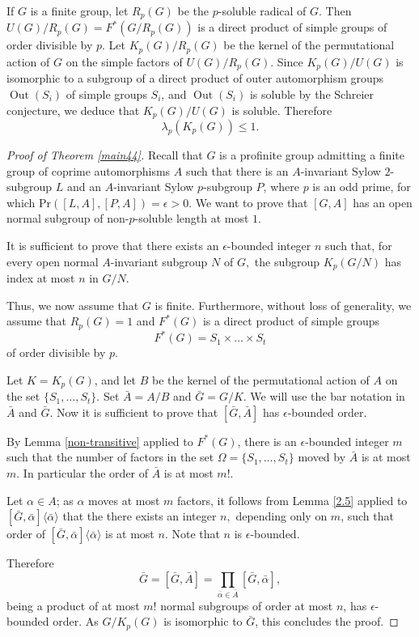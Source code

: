 \documentclass[12pt]{amsart}
\newcommand{\al }{\alpha }
\newcommand{\pr }{\mathrm{Pr} }
\newcommand{\ep}{\epsilon}
\DeclareMathOperator{\out}{Out}
\begin{document}
If $G$ is a finite group, let $R_p(G)$ be the $p$-soluble radical of $G$. Then $U(G)/R_p(G)=F^*(G/R_p(G))$ is a direct product of  simple groups of order divisible by $p$. Let $K_p(G)/R_p(G)$ be the kernel of the permutational action of $G$ on the simple factors of $U(G)/R_p(G)$. Since $K_p(G)/U(G)$ is isomorphic to a subgroup of a direct product of  outer automorphism groups $\out(S_i)$ of  simple groups $S_i$, and  $\out(S_i)$ is soluble by the Schreier conjecture, we deduce 
 that $K_p(G)/U(G)$ is soluble. Therefore 
\[\lambda_p(K_p(G))\le 1. \]

\begin{proof}[Proof of Theorem \ref{main44}] Recall that $G$ is a  profinite group admitting a finite group of coprime automorphisms $A$ such that there is an $A$-invariant Sylow $2$-subgroup $L$ and an $A$-invariant Sylow $p$-subgroup $P$, where $p$ is an odd prime, for which $\pr([L,A],[P,A])=\ep>0$. 
We want to prove that $[G,A]$ has an open normal subgroup of non-$p$-soluble length at most $1$. 

It is sufficient to prove that there exists an $\epsilon$-bounded integer $n$ such that, for every open normal $A$-invariant subgroup $N$   of $G,$ the subgroup $K_p(G/N)$ has index at most $n$ in $G/N$. 

Thus, we now assume that $G$ is finite. Furthermore, without loss of generality, we assume that $R_p(G)=1$ and $F^*(G)$ is a direct product of simple groups 
    \[F^*(G)=S_1\times\dots\times S_t\] of order divisible by $p$.
 
    
Let $K=K_p(G)$, and let $B$ be the kernel of the permutational action of $A$ on the set $\{S_1,\dots,S_t \}$. Set $\bar A=A/B$ and $\bar G=G/K$. We will use the bar notation in $\bar A$ and $\bar G$. Now it is sufficient to prove that $[\bar G,\bar A]$ has $\epsilon$-bounded order. 
  
By Lemma \ref{non-transitive} applied to $F^*(G)$, there is an $\epsilon$-bounded integer $m$ such that the number of factors  in the set $\Omega=\{ S_1, \dots , S_t \}$ moved by $\bar A$  is at most $m$. In particular the order of $\bar A$ is at most $m!$.  

Let $\al \in A$; as $\al$ moves at most $m$ factors, it follows from Lemma \ref{2.5} applied to $[\bar G,\bar \al]\langle \bar \al \rangle$ that the there exists an integer $n,$ depending only on $m$, such that order of $[\bar G,\bar \al]\langle \bar\al \rangle$ is at most $n$. Note that $n$ is $\epsilon$-bounded.
 
Therefore
\[ \bar G=[\bar G,\bar A]= \prod_{\bar\al \in \bar A} [\bar G,\bar\al],\] 
 being a product of at most $m!$ normal subgroups of order at most $n$, has $\epsilon$-bounded order. As $G/K_p(G)$ is isomorphic to $\bar G$, this concludes the proof.
\end{proof}
\end{document}
